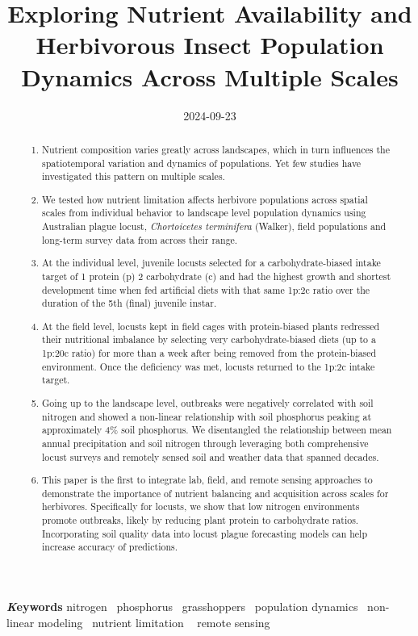\documentclass[
]{article}
\title{Exploring Nutrient Availability and Herbivorous Insect Population
Dynamics Across Multiple Scales}
\author{\asep\asep\asep\asep\asep\asep\asep\asep\asep}
\date{2024-09-23}
\begin{document}
\maketitle
\begin{abstract}
\begin{enumerate}
\def\labelenumi{\arabic{enumi}.}
\item
  Nutrient composition varies greatly across landscapes, which in turn
  influences the spatiotemporal variation and dynamics of populations.
  Yet few studies have investigated this pattern on multiple scales.
\item
  We tested how nutrient limitation affects herbivore populations across
  spatial scales from individual behavior to landscape level population
  dynamics using Australian plague locust, \emph{Chortoicetes
  terminifera} (Walker), field populations and long-term survey data
  from across their range.
\item
  At the individual level, juvenile locusts selected for a
  carbohydrate-biased intake target of 1 protein (p) 2 carbohydrate (c)
  and had the highest growth and shortest development time when fed
  artificial diets with that same 1p:2c ratio over the duration of the
  5th (final) juvenile instar.
\item
  At the field level, locusts kept in field cages with protein-biased
  plants redressed their nutritional imbalance by selecting very
  carbohydrate-biased diets (up to a 1p:20c ratio) for more than a week
  after being removed from the protein-biased environment. Once the
  deficiency was met, locusts returned to the 1p:2c intake target.
\item
  Going up to the landscape level, outbreaks were negatively correlated
  with soil nitrogen and showed a non-linear relationship with soil
  phosphorus peaking at approximately 4\% soil phosphorus. We
  disentangled the relationship between mean annual precipitation and
  soil nitrogen through leveraging both comprehensive locust surveys and
  remotely sensed soil and weather data that spanned decades.
\item
  This paper is the first to integrate lab, field, and remote sensing
  approaches to demonstrate the importance of nutrient balancing and
  acquisition across scales for herbivores. Specifically for locusts, we
  show that low nitrogen environments promote outbreaks, likely by
  reducing plant protein to carbohydrate ratios. Incorporating soil
  quality data into locust plague forecasting models can help increase
  accuracy of predictions.
\end{enumerate}
\end{abstract}
{\bfseries \emph Keywords}
\def\sep{\textbullet\ }
nitrogen \sep phosphorus \sep grasshoppers \sep population
dynamics \sep non-linear modeling \sep nutrient limitation \sep 
remote sensing
\end{document}
